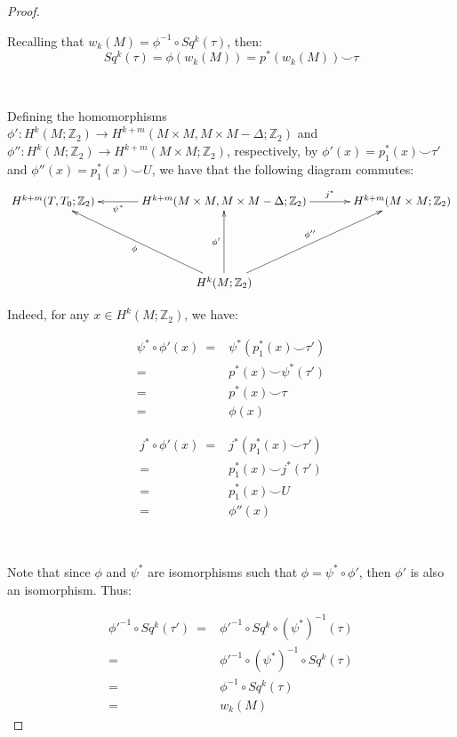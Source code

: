 \documentclass[12pt,oneside]{book}
\newcommand{\Z}{\mathbb{Z}}
\newcommand{\ccup}{\smile}
\begin{document}
    \begin{proof}

        \

        Recalling that $w_{k}(M) = \phi^{-1} \circ Sq^{k}(\tau)$, then:
        $$ Sq^{k}(\tau) = \phi(w_{k}(M)) = p^{*}(w_{k}(M)) \ccup \tau $$

        \
        
        Defining the homomorphisms $\phi' : H^{k}(M;\Z_{2}) \to H^{k+m}(M \times M, M \times M - \Delta; \Z_{2})$ and 
        $\phi'' : H^{k}(M;\Z_{2}) \to H^{k+m}(M \times M; \Z_{2})$, respectively, by $\phi'(x) = p_{1}^{*}(x) \ccup \tau'$ and 
        $\phi''(x) = p_{1}^{*}(x) \ccup U$, we have that the following diagram commutes:
        $$
        \xymatrix @C=0.5cm {
        	H^{k+m}(T, T_{0}; \Z_{2}) && H^{k+m}(M \times M, M \times M - \Delta; \Z_{2}) \ar[ll]^-{\psi^{*}} \ar[rr]^-{j^{*}} && H^{k+m}(M \times M; \Z_{2}) \\
        	&& && \\
        	&& H^{k}(M; \Z_{2}) \ar[lluu]^-{\phi} \ar[uu]^-{\phi'} \ar[rruu]^-{\phi''} &&
        }
        $$
        
        Indeed, for any $x \in H^{k}(M; \Z_{2})$, we have:
        
        $$
        \begin{array}{rl}
        	\psi^{*} \circ \phi'(x) \ = & \psi^{*}(p_{1}^{*}(x) \ccup \tau') \\
        	= & p^{*}(x) \ccup \psi^{*}(\tau') \\
        	= & p^{*}(x) \ccup \tau \\
        	= & \phi(x)
        \end{array}
        $$

        $$
        \begin{array}{rl}
        	j^{*} \circ \phi'(x) \ = & j^{*}(p_{1}^{*}(x) \ccup \tau') \\
        	= & p_{1}^{*}(x) \ccup j^{*}(\tau') \\
        	= & p_{1}^{*}(x) \ccup U \\
        	= & \phi''(x)
        \end{array}
        $$

        \

        Note that since $\phi$ and $\psi^{*}$ are isomorphisms such that $\phi = \psi^{*} \circ \phi'$, then $\phi'$ is also an isomorphism. 
        Thus:

        $$
        \begin{array}{rl}
        	\phi'^{-1} \circ Sq^{k}(\tau') \ = & \phi'^{-1} \circ Sq^{k} \circ (\psi^{*})^{-1}(\tau) \\
        	= & \phi'^{-1} \circ (\psi^{*})^{-1} \circ Sq^{k}(\tau) \\
        	= & \phi^{-1} \circ Sq^{k}(\tau) \\
        	= & w_{k}(M)
        \end{array}
        $$


\end{proof}
\end{document}
